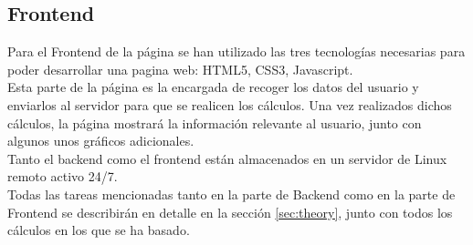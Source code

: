 \subsection{Frontend}
 Para el Frontend de la página se han utilizado las tres tecnologías necesarias para poder desarrollar una pagina web: HTML5, CSS3, Javascript.\\
 

Esta parte de la página es la encargada de recoger los datos del usuario  y enviarlos al servidor para que se realicen los cálculos. Una vez realizados dichos cálculos, la página mostrará la información relevante al usuario, junto con algunos unos gráficos adicionales.\\

Tanto el backend como el frontend están almacenados en un servidor de Linux remoto activo 24/7.\\

Todas las tareas mencionadas tanto en la parte de Backend como en la parte de Frontend se describirán en detalle en la sección \ref{sec:theory}, junto con todos los cálculos en los que se ha basado. 

\newpage